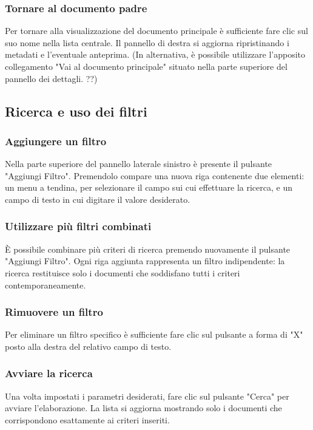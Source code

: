 \documentclass[a4paper,12pt]{article}
\begin{document}
            \subsubsection{Tornare al documento padre}
            Per tornare alla visualizzazione del documento principale è sufficiente fare clic sul suo nome nella lista centrale. Il pannello di destra si aggiorna ripristinando i metadati e l'eventuale anteprima.
            (In alternativa, è possibile utilizzare l'apposito collegamento "Vai al documento principale" situato nella parte superiore del pannello dei dettagli. ??)

        \subsection{Ricerca e uso dei filtri}
            \label{sec:filtri}
            \subsubsection{Aggiungere un filtro}
            Nella parte superiore del pannello laterale sinistro è presente il pulsante "Aggiungi Filtro". Premendolo compare una nuova riga contenente due elementi: un menu a tendina, per selezionare il campo sui cui effettuare la ricerca, e un campo di testo in cui digitare il valore desiderato.

            \subsubsection{Utilizzare più filtri combinati}
            È possibile combinare più criteri di ricerca premendo nuovamente il pulsante "Aggiungi Filtro". Ogni riga aggiunta rappresenta un filtro indipendente: la ricerca restituisce solo i documenti che soddisfano tutti i criteri contemporaneamente.

            \subsubsection{Rimuovere un filtro}
            Per eliminare un filtro specifico è sufficiente fare clic sul pulsante a forma di "X" posto alla destra del relativo campo di testo.

            \subsubsection{Avviare la ricerca}
            Una volta impostati i parametri desiderati, fare clic sul pulsante "Cerca" per avviare l'elaborazione. La lista si aggiorna mostrando solo i documenti che corrispondono esattamente ai criteri inseriti.
\end{document}
